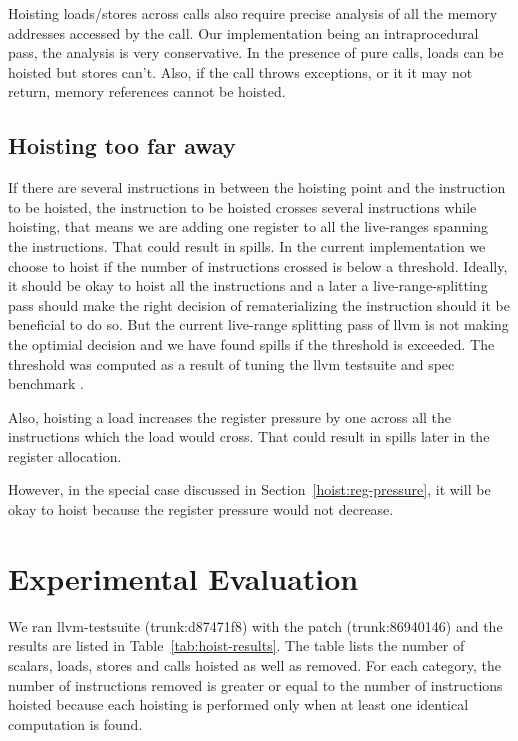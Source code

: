 \documentclass{sig-alternate}
\begin{document}
Hoisting loads/stores across calls also require precise analysis of all the
memory addresses accessed by the call. Our implementation being an
intraprocedural pass, the analysis is very conservative. In the presence of pure
calls, loads can be hoisted but stores can't. Also, if the call throws
exceptions, or it it may not return, memory references cannot be hoisted.

\subsection{Hoisting too far away}
If there are several instructions in between the hoisting point and the
instruction to be hoisted, the instruction to be hoisted crosses several
instructions while hoisting, that means we are adding one register to all the
live-ranges spanning the instructions. That could result in spills. In the
current implementation we choose to hoist if the number of instructions crossed
is below a threshold. Ideally, it should be okay to hoist all the instructions
and a later a live-range-splitting \cite{cooper1998live} pass should make the
right decision of rematerializing the instruction should it be beneficial to do
so. But the current live-range splitting pass of llvm is not making the optimial
decision and we have found spills if the threshold is exceeded. The threshold
was computed as a result of tuning the llvm testsuite \cite{llvm-nightly} and
spec benchmark \cite{Henning2000}.

Also, hoisting a load increases the register pressure by one across all the
instructions which the load would cross. That could result in spills later in
the register allocation.

However, in the special case discussed in Section~\ref{hoist:reg-pressure}, it
will be okay to hoist because the register pressure would not decrease.


\section{Experimental Evaluation}
\label{sec:experimental-results}
We ran llvm-testsuite (trunk:d87471f8) with the patch (trunk:86940146) and the
results are listed in Table~\ref{tab:hoist-results}. The table lists the number
of scalars, loads, stores and calls hoisted as well as removed. For each
category, the number of instructions removed is greater or equal to the number
of instructions hoisted because each hoisting is performed only when at least
one identical computation is found.
\end{document}
